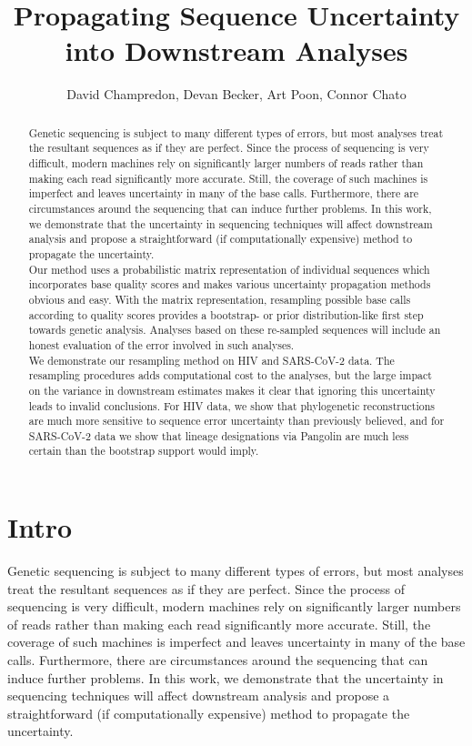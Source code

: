 \documentclass[]{article}
\title{Propagating Sequence Uncertainty into Downstream Analyses}
\author{David Champredon, Devan Becker, Art Poon, Connor Chato}
\date{}
\begin{document}
\maketitle
\begin{abstract}
Genetic sequencing is subject to many different types of errors, but
most analyses treat the resultant sequences as if they are perfect.
Since the process of sequencing is very difficult, modern machines rely
on significantly larger numbers of reads rather than making each read
significantly more accurate. Still, the coverage of such machines is
imperfect and leaves uncertainty in many of the base calls. Furthermore,
there are circumstances around the sequencing that can induce further
problems. In this work, we demonstrate that the uncertainty in
sequencing techniques will affect downstream analysis and propose a
straightforward (if computationally expensive) method to propagate the
uncertainty.\\
Our method uses a probabilistic matrix representation of individual
sequences which incorporates base quality scores and makes various
uncertainty propagation methods obvious and easy. With the matrix
representation, resampling possible base calls according to quality
scores provides a bootstrap- or prior distribution-like first step
towards genetic analysis. Analyses based on these re-sampled sequences
will include an honest evaluation of the error involved in such
analyses.\\
We demonstrate our resampling method on HIV and SARS-CoV-2 data. The
resampling procedures adds computational cost to the analyses, but the
large impact on the variance in downstream estimates makes it clear that
ignoring this uncertainty leads to invalid conclusions. For HIV data, we
show that phylogenetic reconstructions are much more sensitive to
sequence error uncertainty than previously believed, and for SARS-CoV-2
data we show that lineage designations via Pangolin are much less
certain than the bootstrap support would imply.
\end{abstract}

\hypertarget{intro}{%
\section{Intro}\label{intro}}

Genetic sequencing is subject to many different types of errors, but
most analyses treat the resultant sequences as if they are perfect.
Since the process of sequencing is very difficult, modern machines rely
on significantly larger numbers of reads rather than making each read
significantly more accurate. Still, the coverage of such machines is
imperfect and leaves uncertainty in many of the base calls. Furthermore,
there are circumstances around the sequencing that can induce further
problems. In this work, we demonstrate that the uncertainty in
sequencing techniques will affect downstream analysis and propose a
straightforward (if computationally expensive) method to propagate the
uncertainty.
\end{document}
